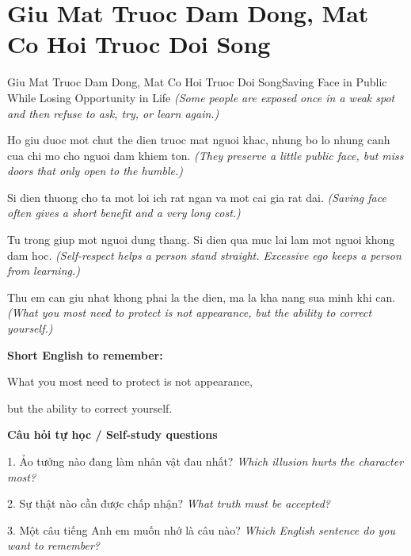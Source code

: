 \section{Giu Mat Truoc Dam Dong, Mat Co Hoi Truoc Doi Song}
\begin{truyen}{Giu Mat Truoc Dam Dong, Mat Co Hoi Truoc Doi Song}{Saving Face in Public While Losing Opportunity in Life}
\textit{(Some people are exposed once in a weak spot and then refuse to ask, try, or learn again.)}

Ho giu duoc mot chut the dien truoc mat nguoi khac, nhung bo lo nhung canh cua chi mo cho nguoi dam khiem ton.
\textit{(They preserve a little public face, but miss doors that only open to the humble.)}

Si dien thuong cho ta mot loi ich rat ngan va mot cai gia rat dai.
\textit{(Saving face often gives a short benefit and a very long cost.)}

Tu trong giup mot nguoi dung thang. Si dien qua muc lai lam mot nguoi khong dam hoc.
\textit{(Self-respect helps a person stand straight. Excessive ego keeps a person from learning.)}

\end{truyen}

\begin{baihoc}
Thu em can giu nhat khong phai la the dien, ma la kha nang sua minh khi can.
\textit{(What you most need to protect is not appearance, but the ability to correct yourself.)}
\end{baihoc}

\begin{ghinhoanh}
\textbf{Short English to remember:}

What you most need to protect is not appearance,

but the ability to correct yourself.

\end{ghinhoanh}

\begin{tuhocnhanh}
\textbf{Câu hỏi tự học / Self-study questions}

1. Ảo tưởng nào đang làm nhân vật đau nhất? \textit{Which illusion hurts the character most?}

2. Sự thật nào cần được chấp nhận? \textit{What truth must be accepted?}

3. Một câu tiếng Anh em muốn nhớ là câu nào? \textit{Which English sentence do you want to remember?}
\end{tuhocnhanh}
\ngancach


